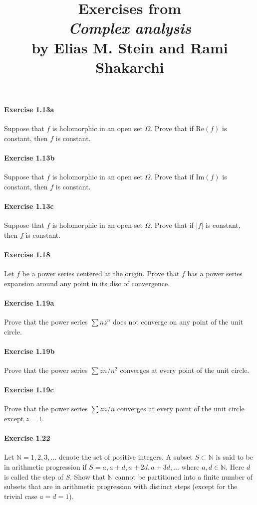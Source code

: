 \documentclass{article}
\title{\textbf{
Exercises from \\
\textit{Complex analysis} \\
by Elias M. Stein and Rami Shakarchi
}}
\date{}
\begin{document}
\maketitle

\paragraph{Exercise 1.13a} Suppose that $f$ is holomorphic in an open set $\Omega$. Prove that if $\text{Re}(f)$ is constant, then $f$ is constant.

\paragraph{Exercise 1.13b} Suppose that $f$ is holomorphic in an open set $\Omega$. Prove that if $\text{Im}(f)$ is constant, then $f$ is constant.

\paragraph{Exercise 1.13c} Suppose that $f$ is holomorphic in an open set $\Omega$. Prove that if $|f|$ is constant, then $f$ is constant.

\paragraph{Exercise 1.18} Let $f$ be a power series centered at the origin. Prove that $f$ has a power series expansion around any point in its disc of convergence.

\paragraph{Exercise 1.19a} Prove that the power series $\sum nz^n$ does not converge on any point of the unit circle.

\paragraph{Exercise 1.19b} Prove that the power series $\sum zn/n^2$ converges at every point of the unit circle.

\paragraph{Exercise 1.19c} Prove that the power series $\sum zn/n$ converges at every point of the unit circle except $z = 1$.

\paragraph{Exercise 1.22} Let $\mathbb{N} = {1, 2, 3, \ldots}$ denote the set of positive integers. A subset $S \subset \mathbb{N}$ is said to be in arithmetic progression if $S = {a, a + d, a + 2d, a + 3d, \ldots}$ where $a, d \in \mathbb{N}$. Here $d$ is called the step of $S$.  Show that $\mathbb{N}$ cannot be partitioned into a finite number of subsets that are in arithmetic progression with distinct steps (except for the trivial case $a = d = 1$).
\end{document}
